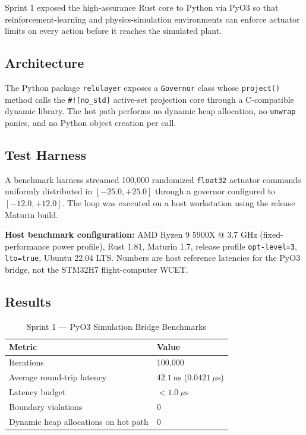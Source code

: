 \documentclass[11pt]{article}
\begin{document}
Sprint 1 exposed the high-assurance Rust core to Python via PyO3 so that reinforcement-learning and physics-simulation environments can enforce actuator limits on every action before it reaches the simulated plant.

\subsection{Architecture}

The Python package \texttt{relulayer} exposes a \texttt{Governor} class whose \texttt{project()} method calls the \texttt{\#![no\_std]} active-set projection core through a C-compatible dynamic library. The hot path performs no dynamic heap allocation, no \texttt{unwrap} panics, and no Python object creation per call.

\subsection{Test Harness}

A benchmark harness streamed 100,000 randomized \texttt{float32} actuator commands uniformly distributed in $[-25.0, +25.0]$ through a governor configured to $[-12.0, +12.0]$. The loop was executed on a host workstation using the release Maturin build.

\textbf{Host benchmark configuration:} AMD Ryzen 9 5900X @ 3.7 GHz (fixed-performance power profile), Rust 1.81, Maturin 1.7, release profile \texttt{opt-level=3}, \texttt{lto=true}, Ubuntu 22.04 LTS. Numbers are host reference latencies for the PyO3 bridge, not the STM32H7 flight-computer WCET.

\subsection{Results}

\begin{table}[htbp]
\centering
\caption{Sprint 1 --- PyO3 Simulation Bridge Benchmarks}
\label{tab:sprint1}
\begin{tabularx}{\textwidth}{@{}lX@{}}
\toprule
\textbf{Metric} & \textbf{Value} \\
\midrule
Iterations & 100,000 \\
Average round-trip latency & $42.1\ \text{ns}$ ($0.0421\ \mu\text{s}$) \\
Latency budget & $<1.0\ \mu\text{s}$ \\
Boundary violations & 0 \\
Dynamic heap allocations on hot path & 0 \\
\bottomrule
\end{tabularx}
\end{table}
\end{document}
